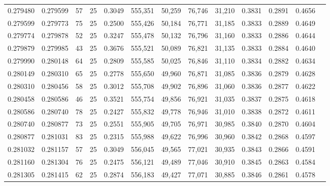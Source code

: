 \begin{tabular}{rrrrrrrrrrrrr}
0.279480 & 0.279599 &    57 &  25 &                                     0.3049 & 555,351 &  50,259 &  76,746 &  31,210 & 0.3831 & 0.2891 & 0.4656 \\
0.279599 & 0.279773 &    75 &  25 &                                     0.2500 & 555,426 &  50,184 &  76,771 &  31,185 & 0.3833 & 0.2889 & 0.4649 \\
0.279774 & 0.279878 &    52 &  25 &                                     0.3247 & 555,478 &  50,132 &  76,796 &  31,160 & 0.3833 & 0.2886 & 0.4644 \\
0.279879 & 0.279985 &    43 &  25 &                                     0.3676 & 555,521 &  50,089 &  76,821 &  31,135 & 0.3833 & 0.2884 & 0.4640 \\
0.279990 & 0.280148 &    64 &  25 &                                     0.2809 & 555,585 &  50,025 &  76,846 &  31,110 & 0.3834 & 0.2882 & 0.4634 \\
0.280149 & 0.280310 &    65 &  25 &                                     0.2778 & 555,650 &  49,960 &  76,871 &  31,085 & 0.3836 & 0.2879 & 0.4628 \\
0.280310 & 0.280456 &    58 &  25 &                                     0.3012 & 555,708 &  49,902 &  76,896 &  31,060 & 0.3836 & 0.2877 & 0.4622 \\
0.280458 & 0.280586 &    46 &  25 &                                     0.3521 & 555,754 &  49,856 &  76,921 &  31,035 & 0.3837 & 0.2875 & 0.4618 \\
0.280586 & 0.280740 &    78 &  25 &                                     0.2427 & 555,832 &  49,778 &  76,946 &  31,010 & 0.3838 & 0.2872 & 0.4611 \\
0.280740 & 0.280877 &    73 &  25 &                                     0.2551 & 555,905 &  49,705 &  76,971 &  30,985 & 0.3840 & 0.2870 & 0.4604 \\
0.280877 & 0.281031 &    83 &  25 &                                     0.2315 & 555,988 &  49,622 &  76,996 &  30,960 & 0.3842 & 0.2868 & 0.4597 \\
0.281032 & 0.281157 &    57 &  25 &                                     0.3049 & 556,045 &  49,565 &  77,021 &  30,935 & 0.3843 & 0.2866 & 0.4591 \\
0.281160 & 0.281304 &    76 &  25 &                                     0.2475 & 556,121 &  49,489 &  77,046 &  30,910 & 0.3845 & 0.2863 & 0.4584 \\
0.281305 & 0.281415 &    62 &  25 &                                     0.2874 & 556,183 &  49,427 &  77,071 &  30,885 & 0.3846 & 0.2861 & 0.4578 \\

\end{tabular}
